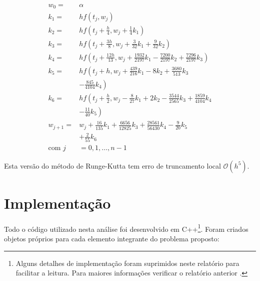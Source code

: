 \documentclass[final,5p]{elsarticle}
\numberwithin{equation}{section}
\begin{document}
        \begin{align}
            w_0 =& \alpha \nonumber \\
            k_1 =& hf\left(t_j,w_j\right) \nonumber \\
            k_2 =& hf\left(t_j + \frac{h}{4},w_j + \frac{1}{4}k_1 \right) \nonumber \\
            k_3 =& hf\left(t_j + \frac{3h}{8},w_j + \frac{3}{32}k_1+\frac{9}{32}k_2 \right) \nonumber \\
            k_4 =& hf\left(t_j + \frac{12h}{13},w_j + \frac{1932}{2197}k_1 - \frac{7200}{2197}k_2+\frac{7296}{2197}k_3\right) \nonumber \\
            k_5 =& hf\left(t_j + h,w_j + \frac{439}{216}k_1 - 8k_2+\frac{3680}{513}k_3 \right. \nonumber \\
            & \left. - \frac{845}{4104}k_4 \right) \nonumber \\
            k_6 =& hf\left(t_j + \frac{h}{2},w_j - \frac{8}{27}k_1 + 2k_2 - \frac{3544}{2565}k_3+\frac{1859}{4104}k_4 \right. \nonumber \\
            & \left. - \frac{11}{40}k_5 \right) \nonumber \\
            w_{j+1} =& w_{j} + \frac{16}{135} k_1 + \frac{6656}{12825} k_3 + \frac{28561}{56430} k_4 - \frac{9}{20} k_5 \nonumber \\
            & + \frac{2}{55} k_6 \label{eq:rk6} \\
            \text{com } j&=0,1,\ldots,n-1 \nonumber
        \end{align}

        Esta versão do método de Runge-Kutta tem erro de truncamento local $\mathcal{O}(h^5)$.

\section{Implementação} \label{sec:implementacao}

        Todo o código utilizado nesta análise foi desenvolvido em C++\footnote{Alguns detalhes de implementação foram suprimidos neste relatório para facilitar a leitura. Para maiores informações verificar o relatório anterior \cite{relatoriorungekutta}.}. Foram criados objetos próprios para cada elemento integrante do problema proposto:
\end{document}
